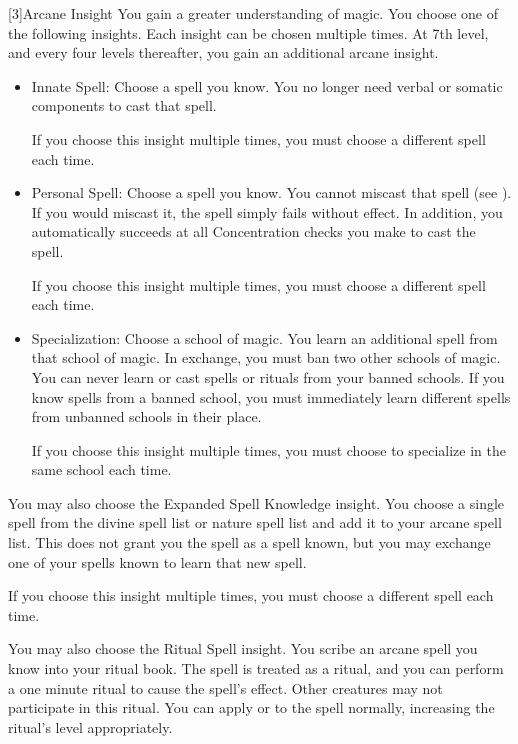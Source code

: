         [3]{Arcane Insight} 
        You gain a greater understanding of magic.
        You choose one of the following insights.
        Each insight can be chosen multiple times.
        At 7th level, and every four levels thereafter, you gain an additional arcane insight.
        \begin{itemize}
            \item Innate Spell: Choose a spell you know.
                You no longer need verbal or somatic components to cast that spell.
                \par If you choose this insight multiple times, you must choose a different spell each time.
            \item Personal Spell: Choose a spell you know.
                You cannot miscast that spell (see ).
                If you would miscast it, the spell simply fails without effect.
                In addition, you automatically succeeds at all Concentration checks you make to cast the spell.
                \par If you choose this insight multiple times, you must choose a different spell each time.
            \item Specialization: Choose a school of magic.
                You learn an additional spell from that school of magic.
                In exchange, you must ban two other schools of magic.
                You can never learn or cast spells or rituals from your banned schools.
                If you know spells from a banned school, you must immediately learn different spells from unbanned schools in their place.
                \par If you choose this insight multiple times, you must choose to specialize in the same school each time.
        \end{itemize}

         You may also choose the Expanded Spell Knowledge insight.
        You choose a single spell from the divine spell list or nature spell list and add it to your arcane spell list.
        This does not grant you the spell as a spell known, but you may exchange one of your spells known to learn that new spell.
        \par If you choose this insight multiple times, you must choose a different spell each time.

         You may also choose the Ritual Spell insight.
        You scribe an arcane spell you know into your ritual book.
        The spell is treated as a ritual, and you can perform a one minute ritual to cause the spell's effect.
        Other creatures may not participate in this ritual.
        You can apply  or  to the spell normally, increasing the ritual's level appropriately.

